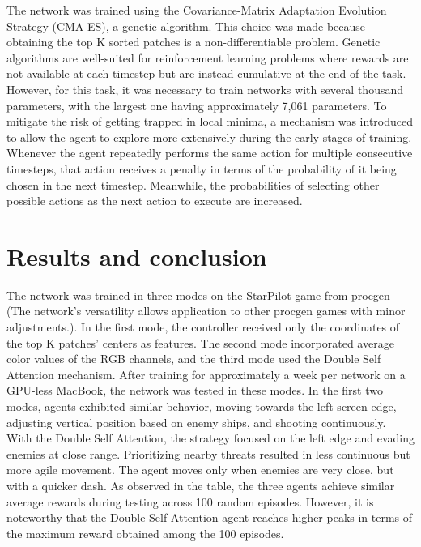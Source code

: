 \documentclass{article}
\begin{document}
The network was trained using the Covariance-Matrix Adaptation Evolution Strategy (CMA-ES\cite{cmaes}), a genetic algorithm. This choice was made because obtaining the top K sorted patches is a non-differentiable problem. Genetic algorithms are well-suited for reinforcement learning problems where rewards are not available at each timestep but are instead cumulative at the end of the task. However, for this task, it was necessary to train networks with several thousand parameters, with the largest one having approximately 7,061 parameters. To mitigate the risk of getting trapped in local minima, a mechanism was introduced to allow the agent to explore more extensively during the early stages of training. Whenever the agent repeatedly performs the same action for multiple consecutive timesteps, that action receives a penalty in terms of the probability of it being chosen in the next timestep. Meanwhile, the probabilities of selecting other possible actions as the next action to execute are increased.

\section{Results and conclusion}

The network was trained in three modes on the StarPilot game from procgen (The network's versatility allows application to other procgen games with minor adjustments.). In the first mode, the controller received only the coordinates of the top K patches' centers as features. The second mode incorporated average color values of the RGB channels, and the third mode used the Double Self Attention mechanism. After training for approximately a week per network on a GPU-less MacBook, the network was tested in these modes. In the first two modes, agents exhibited similar behavior, moving towards the left screen edge, adjusting vertical position based on enemy ships, and shooting continuously. With the Double Self Attention, the strategy focused on the left edge and evading enemies at close range. Prioritizing nearby threats resulted in less continuous but more agile movement. The agent moves only when enemies are very close, but with a quicker dash. As observed in the table, the three agents achieve similar average rewards during testing across 100 random episodes. However, it is noteworthy that the Double Self Attention agent reaches higher peaks in terms of the maximum reward obtained among the 100 episodes.
\end{document}
